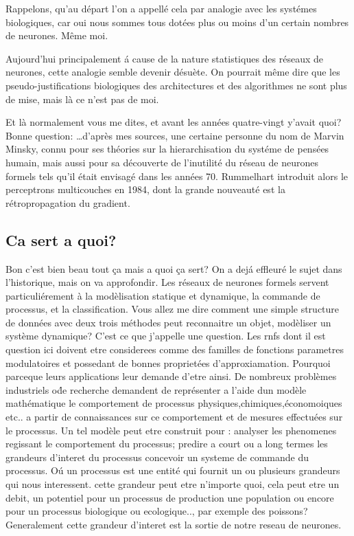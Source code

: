 \documentclass[a4paper,12pt]{report}
\begin{document}
Rappelons, qu'au d\'epart l'on a appell\'e cela par analogie avec les
syst\'emes biologiques, car oui nous sommes tous dot\'ees plus ou
moins d'un certain nombres de neurones. M\^eme moi.

Aujourd'hui principalement \'a cause de la nature statistiques des
r\'eseaux de neurones, cette analogie semble devenir d\'esu\`ete.
On pourrait m\^eme dire que les pseudo-justifications biologiques des
architectures et des algorithmes ne sont plus de mise, mais l\`a ce
n'est pas de moi.

Et l\`a normalement vous me dites, et avant les ann\'ees quatre-vingt
y'avait quoi? Bonne question: \dots d'apr\`es mes sources, une certaine
personne du nom de Marvin Minsky, connu pour ses th\'eories sur la
hierarchisation du syst\'eme de pens\'ees humain, mais aussi pour sa
d\'ecouverte de l'inutilit\'e du r\'eseau de neurones formels tels
qu'il \'etait envisag\'e dans les ann\'ees 70. Rummelhart introduit
alors le perceptrons multicouches en 1984, dont la grande nouveaut\'e
est la r\'etropropagation du gradient.

\subsection{Ca sert a quoi?}
Bon c'est bien beau tout \c ca mais a quoi  \c ca sert? On a
dej\'a effleur\'e le sujet dans l'historique, mais on va
approfondir. Les r\'eseaux de neurones formels servent
particuli\'erement \`a la mod\`elisation statique et dynamique, la
commande de processus, et la classification. Vous allez me dire
comment une simple structure de donn\'ees avec deux trois m\'ethodes
peut reconnaitre un objet, mod\`eliser un syst\`eme dynamique? C'est
ce que j'appelle une question.
Les rnfs dont il est question ici doivent etre considerees comme des familles de fonctions parametres
modulatoires et possedant de bonnes propriet\'ees
d'approxiamation. Pourquoi parceque leurs applications leur demande
d'etre ainsi.
De nombreux probl\`emes industriels o\' de recherche demandent de
repr\'esenter a l'aide dun mod\`ele math\'ematique le comportement de
processus physiques,chimiques,\'economoiques etc.. a partir de
connaissances sur ce comportement et de mesures effectu\'ees
sur le processus. Un tel mod\`ele peut etre construit pour :
analyser les phenomenes regissant le comportement du processus;
predire a court ou a long termes les grandeurs d'interet du processus
concevoir un systeme de commande du processus.
O\'u un processus est une entit\'e qui fournit un ou plusieurs
grandeurs qui nous interessent. cette grandeur peut etre n'importe
quoi, cela peut etre un debit, un
potentiel pour un processus de production une population ou encore
pour un processus biologique ou ecologique.., par exemple des poissons?
Generalement cette grandeur d'interet est la sortie de notre reseau de
neurones.
\end{document}
